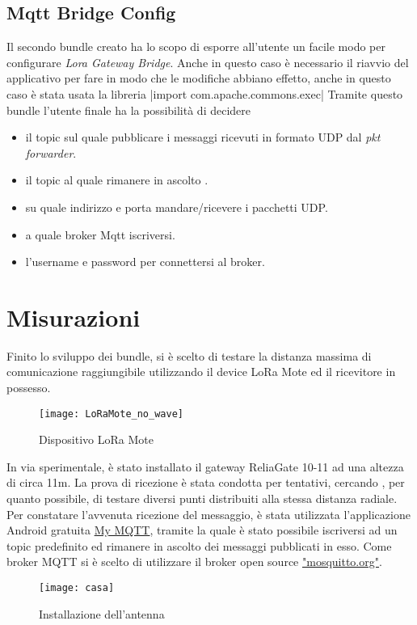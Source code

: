 \subsection{Mqtt Bridge Config}
Il secondo bundle creato ha lo scopo di esporre all'utente un facile modo per
configurare  \emph{Lora Gateway Bridge}.  Anche in questo caso è necessario il
riavvio del applicativo per fare in modo che le modifiche abbiano effetto, anche
in questo caso è stata usata la libreria
|import com.apache.commons.exec|
Tramite questo bundle l'utente finale ha la possibilità di decidere 
\begin{itemize}
\item il topic sul quale pubblicare i messaggi ricevuti in formato UDP dal
\emph{pkt forwarder}.
\item il topic al quale rimanere in ascolto .
\item su quale indirizzo e porta mandare/ricevere i pacchetti UDP.
\item a quale broker Mqtt iscriversi.
\item l'username e password per connettersi al broker.
\end{itemize}


\section{Misurazioni}
Finito lo sviluppo dei bundle, si è scelto di testare la distanza massima
di comunicazione raggiungibile utilizzando il device LoRa Mote ed il ricevitore in
possesso.
\begin{figure}[h]
        \centering 
                \texttt{[image: LoRaMote\_no\_wave]}
        \caption{Dispositivo LoRa Mote}
        \label{fig:Software_stack}
\end{figure}
In via sperimentale, è stato installato  il gateway
ReliaGate 10-11 ad una altezza di circa 11m. La prova di ricezione è stata condotta per
tentativi, cercando , per quanto possibile, di testare diversi punti distribuiti
alla stessa distanza radiale. 
Per constatare l'avvenuta ricezione del
messaggio, è stata utilizzata l'applicazione Android gratuita \href{
https://play.google.com/store/apps/details?id=at.tripwire.mqtt.client&hl=en}{My
MQTT}, tramite la
quale è stato possibile iscriversi ad un topic predefinito ed rimanere in ascolto dei
messaggi pubblicati in esso. 
Come broker MQTT si è scelto di utilizzare il
broker open source \href{http://mosquitto.org/}{"mosquitto.org"}. 
\begin{figure}[h]
        \centering 
                \texttt{[image: casa]}
        \caption{Installazione dell'antenna}
        \label{fig:Software_stack}
\end{figure}



